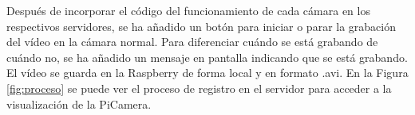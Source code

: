 Después de incorporar el código del funcionamiento de cada cámara en los respectivos servidores, se ha añadido un botón para iniciar o parar la grabación del vídeo en la cámara normal. Para diferenciar cuándo se está grabando de cuándo no, se ha añadido un mensaje en pantalla indicando que se está grabando. El vídeo se guarda en la Raspberry de forma local y en formato .avi. En la Figura \ref{fig:proceso} se puede ver el proceso de registro en el servidor para acceder a la visualización de la PiCamera.\\
\begin{figure}[h!]
  \begin{center}
    \hspace{1mm}
    \hspace{2mm}
    \hspace{1mm}

\end{center}
\end{figure}
